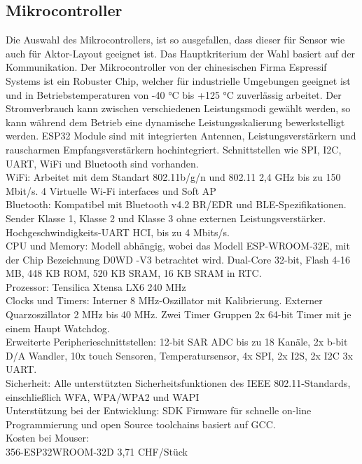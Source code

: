 \subsection{Mikrocontroller}\label{subsec: Mikrocontroller}
Die Auswahl des Mikrocontrollers, ist so ausgefallen, dass dieser für Sensor wie auch für Aktor-Layout geeignet ist. Das Hauptkriterium der Wahl basiert auf der Kommunikation. Der Mikrocontroller von der chinesischen Firma Espressif Systems ist ein Robuster Chip, welcher für industrielle Umgebungen geeignet ist und in Betriebstemperaturen von -40 °C bis +125 °C zuverlässig arbeitet. Der Stromverbrauch kann zwischen verschiedenen Leistungsmodi gewählt werden, so kann während dem Betrieb eine dynamische Leistungsskalierung bewerkstelligt werden. ESP32 Module sind mit integrierten Antennen, Leistungsverstärkern und rauscharmen Empfangsverstärkern hochintegriert. Schnittstellen wie SPI, I2C, UART, WiFi und Bluetooth sind vorhanden.\\
WiFi:
Arbeitet mit dem Standart 802.11b/g/n und 802.11 2,4 GHz bis zu 150 Mbit/s. 4 Virtuelle Wi-Fi interfaces und Soft AP \\
Bluetooth:
Kompatibel mit Bluetooth v4.2 BR/EDR und BLE-Spezifikationen. Sender Klasse 1, Klasse 2 und Klasse 3 ohne externen Leistungsverstärker. Hochgeschwindigkeits-UART HCI, bis zu 4 Mbits/s.\\
CPU und Memory:
Modell abhängig, wobei das Modell ESP-WROOM-32E, mit der Chip Bezeichnung D0WD -V3 betrachtet wird. Dual-Core 32-bit, Flash 4-16 MB, 448 KB ROM, 520 KB SRAM, 16 KB SRAM in RTC. \\
Prozessor:
Tensilica Xtensa LX6 240 MHz\\
Clocks und Timers:
Interner 8 MHz-Oszillator mit Kalibrierung. Externer Quarzoszillator 2 MHz bis 40 MHz. Zwei Timer Gruppen 2x 64-bit Timer mit je einem Haupt Watchdog.\\
Erweiterte Peripherieschnittstellen:
12-bit SAR ADC bis zu 18 Kanäle, 2x b-bit D/A Wandler, 10x touch Sensoren, Temperatursensor, 4x SPI, 2x I2S, 2x I2C 3x UART.\\
Sicherheit:
Alle unterstützten Sicherheitsfunktionen des IEEE 802.11-Standards, einschließlich WFA, WPA/WPA2 und WAPI\\
Unterstützung bei der Entwicklung:
SDK Firmware für schnelle on-line Programmierung und open Source toolchains basiert auf GCC.\\
Kosten bei Mouser:\\
356-ESP32WROOM-32D 3,71 CHF/Stück

